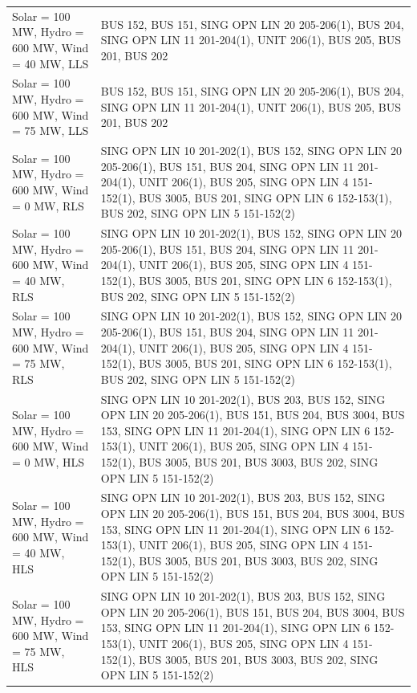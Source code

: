 \documentclass[10pt]{report}
\begin{document}
\begin{table}[H]
{\begin{tabular}{lp{17cm}}
Solar = 100 MW, Hydro = 600 MW, Wind = 40 MW, LLS & BUS 152, BUS 151, SING OPN LIN   20 205-206(1), BUS 204, SING OPN LIN   11 201-204(1), UNIT 206(1), BUS 205, BUS 201, BUS 202 \\
Solar = 100 MW, Hydro = 600 MW, Wind = 75 MW, LLS & BUS 152, BUS 151, SING OPN LIN   20 205-206(1), BUS 204, SING OPN LIN   11 201-204(1), UNIT 206(1), BUS 205, BUS 201, BUS 202 \\
Solar = 100 MW, Hydro = 600 MW, Wind = 0 MW, RLS & SING OPN LIN   10 201-202(1), BUS 152, SING OPN LIN   20 205-206(1), BUS 151, BUS 204, SING OPN LIN   11 201-204(1), UNIT 206(1), BUS 205, SING OPN LIN   4 151-152(1), BUS 3005, BUS 201, SING OPN LIN   6 152-153(1), BUS 202, SING OPN LIN   5 151-152(2) \\
Solar = 100 MW, Hydro = 600 MW, Wind = 40 MW, RLS & SING OPN LIN   10 201-202(1), BUS 152, SING OPN LIN   20 205-206(1), BUS 151, BUS 204, SING OPN LIN   11 201-204(1), UNIT 206(1), BUS 205, SING OPN LIN   4 151-152(1), BUS 3005, BUS 201, SING OPN LIN   6 152-153(1), BUS 202, SING OPN LIN   5 151-152(2) \\
Solar = 100 MW, Hydro = 600 MW, Wind = 75 MW, RLS & SING OPN LIN   10 201-202(1), BUS 152, SING OPN LIN   20 205-206(1), BUS 151, BUS 204, SING OPN LIN   11 201-204(1), UNIT 206(1), BUS 205, SING OPN LIN   4 151-152(1), BUS 3005, BUS 201, SING OPN LIN   6 152-153(1), BUS 202, SING OPN LIN   5 151-152(2) \\
Solar = 100 MW, Hydro = 600 MW, Wind = 0 MW, HLS & SING OPN LIN   10 201-202(1), BUS 203, BUS 152, SING OPN LIN   20 205-206(1), BUS 151, BUS 204, BUS 3004, BUS 153, SING OPN LIN   11 201-204(1), SING OPN LIN   6 152-153(1), UNIT 206(1), BUS 205, SING OPN LIN   4 151-152(1), BUS 3005, BUS 201, BUS 3003, BUS 202, SING OPN LIN   5 151-152(2) \\
Solar = 100 MW, Hydro = 600 MW, Wind = 40 MW, HLS & SING OPN LIN   10 201-202(1), BUS 203, BUS 152, SING OPN LIN   20 205-206(1), BUS 151, BUS 204, BUS 3004, BUS 153, SING OPN LIN   11 201-204(1), SING OPN LIN   6 152-153(1), UNIT 206(1), BUS 205, SING OPN LIN   4 151-152(1), BUS 3005, BUS 201, BUS 3003, BUS 202, SING OPN LIN   5 151-152(2) \\
Solar = 100 MW, Hydro = 600 MW, Wind = 75 MW, HLS & SING OPN LIN   10 201-202(1), BUS 203, BUS 152, SING OPN LIN   20 205-206(1), BUS 151, BUS 204, BUS 3004, BUS 153, SING OPN LIN   11 201-204(1), SING OPN LIN   6 152-153(1), UNIT 206(1), BUS 205, SING OPN LIN   4 151-152(1), BUS 3005, BUS 201, BUS 3003, BUS 202, SING OPN LIN   5 151-152(2) \\
\bottomrule
\end{tabular}}
\end{table}
\end{document}
